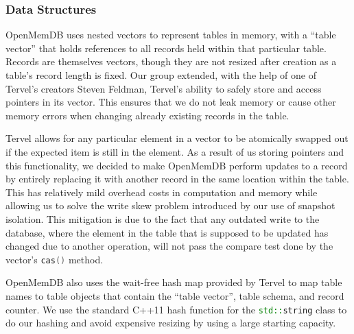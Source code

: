 \documentclass[letterpaper, 11pt]{article}
\newcommand{\inlinecode}[1]{\colorbox{codegrey}{\lstinline[language=C++]{#1}}}
\begin{document}
\subsubsection{Data Structures}
OpenMemDB uses nested vectors to represent tables in memory, with a ``table vector'' that holds references
to all records held within that particular table. Records are themselves vectors, though they are not 
resized after creation as a table's record length is fixed. Our group extended, with the help of 
one of Tervel's creators Steven Feldman, Tervel's ability to safely store and access pointers in its vector. 
This ensures that we do not leak memory or cause other memory errors when changing already existing records
in the table.
\par\vspace{\baselineskip}
Tervel allows for any particular element in a vector to be atomically swapped out if the expected item is still
in the element. As a result of us storing pointers and this functionality, we decided to make OpenMemDB perform 
updates to a record by entirely replacing it with another record in the same location within the table. This has
relatively mild overhead costs in computation and memory while allowing us to solve the write skew problem introduced by
our use of snapshot isolation. This mitigation is due to the fact that any outdated write to the database, where
the element in the table that is supposed to be updated has changed due to another operation, will not pass the compare
test done by the vector's \inlinecode{cas()} method.
\par\vspace{\baselineskip}
OpenMemDB also uses the wait-free hash map provided by Tervel to map table names to table objects that contain
the ``table vector'', table schema, and record counter. We use the standard C++11 hash function for the 
\inlinecode{std::string} class to do our hashing and avoid expensive resizing by using a large starting capacity.
\end{document}
